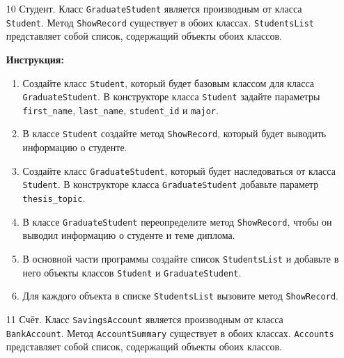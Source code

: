 \begin{enumerate}
\item[10]
Студент. Класс \texttt{GraduateStudent} является производным от класса \texttt{Student}. Метод \texttt{ShowRecord} существует в обоих классах. \texttt{StudentsList} представляет собой список, содержащий объекты обоих классов.

\textbf{Инструкция:}
\begin{enumerate}
    \item Создайте класс \texttt{Student}, который будет базовым классом для класса \texttt{GraduateStudent}. В конструкторе класса \texttt{Student} задайте параметры \texttt{first\_name}, \texttt{last\_name}, \texttt{student\_id} и \texttt{major}.
    \item В классе \texttt{Student} создайте метод \texttt{ShowRecord}, который будет выводить информацию о студенте.
    \item Создайте класс \texttt{GraduateStudent}, который будет наследоваться от класса \texttt{Student}. В конструкторе класса \texttt{GraduateStudent} добавьте параметр \texttt{thesis\_topic}.
    \item В классе \texttt{GraduateStudent} переопределите метод \texttt{ShowRecord}, чтобы он выводил информацию о студенте и теме диплома.
    \item В основной части программы создайте список \texttt{StudentsList} и добавьте в него объекты классов \texttt{Student} и \texttt{GraduateStudent}.
    \item Для каждого объекта в списке \texttt{StudentsList} вызовите метод \texttt{ShowRecord}.
\end{enumerate}

\item[11]
Счёт. Класс \texttt{SavingsAccount} является производным от класса \texttt{BankAccount}. Метод \texttt{AccountSummary} существует в обоих классах. \texttt{Accounts} представляет собой список, содержащий объекты обоих классов.


\end{enumerate}
